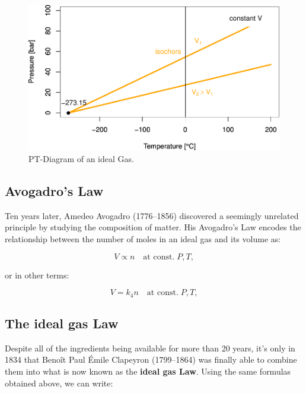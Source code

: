 \documentclass[
  9pt,
]{extbook}
\theoremstyle{definition}
\theoremstyle{definition}
\theoremstyle{definition}
\theoremstyle{remark}
\begin{document}
\begin{figure}

{\centering \includegraphics[width=0.7\linewidth]{pchem1_files/figure-latex/FigTPideal-1} 

}

\caption{PT-Diagram of an ideal Gas.}\label{fig:FigTPideal}
\end{figure}

\hypertarget{avogadros-law}{%
\subsection{Avogadro's Law}\label{avogadros-law}}

Ten years later, Amedeo Avogadro (1776--1856) discovered a seemingly unrelated principle by studying the composition of matter. His Avogadro's Law encodes the relationship between the number of moles in an ideal gas and its volume as:

\begin{equation}
V\propto n\quad\text{at const.}\;P,T,
\label{eq:avogadrolaw1}
\end{equation}

or in other terms:

\begin{equation}
V=k_4 n\quad\text{at const.}\;P,T,
\label{eq:avogadrolaw2}
\end{equation}

\hypertarget{the-ideal-gas-law}{%
\subsection{The ideal gas Law}\label{the-ideal-gas-law}}

Despite all of the ingredients being available for more than 20 years, it's only in 1834 that Benoît Paul Émile Clapeyron (1799--1864) was finally able to combine them into what is now known as the \textbf{ideal gas Law}. Using the same formulas obtained above, we can write:
\end{document}
